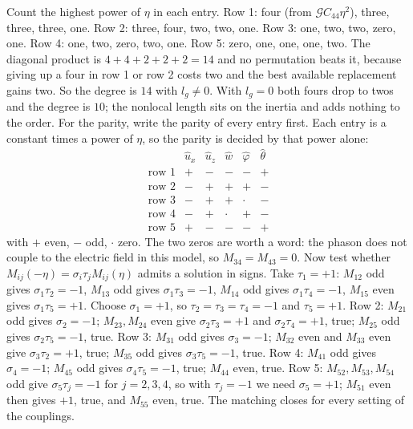 \documentclass[11pt]{article}
\makeatletter
\newif\ifshowworked
\newenvironment{worked}{%
  \ifshowworked\par\smallskip\noindent\textit{Working.}\par\smallskip\else
  \setbox\z@\vbox\bgroup\fi}{\ifshowworked\par\smallskip\else\egroup\fi}
\newcommand{\Gcal}{\mathcal{G}}
\makeatother
\begin{document}
\begin{worked}
Count the highest power of $\eta$ in each entry. Row 1: four (from $\Gcal C_{44}\eta^2$), three, three,
three, one. Row 2: three, four, two, two, one. Row 3: one, two, two, zero, one. Row 4: one, two, zero,
two, one. Row 5: zero, one, one, one, two.
The diagonal product is $4+4+2+2+2=14$ and no permutation beats it, because giving up a four in row 1 or
row 2 costs two and the best available replacement gains two. So the degree is $14$ with $l_g\ne0$. With
$l_g=0$ both fours drop to twos and the degree is $10$; the nonlocal length sits on the inertia and adds
nothing to the order.
For the parity, write the parity of every entry first. Each entry is a constant times a power of $\eta$, so
the parity is decided by that power alone:
\begin{equation}
\begin{array}{c|ccccc}
 & \hat u_x & \hat u_z & \hat w & \hat\varphi & \hat\theta\\\hline
\text{row 1} & + & - & - & - & +\\
\text{row 2} & - & + & + & + & -\\
\text{row 3} & - & + & + & \cdot & -\\
\text{row 4} & - & + & \cdot & + & -\\
\text{row 5} & + & - & - & - & +
\end{array}
\end{equation}
with $+$ even, $-$ odd, $\cdot$ zero. The two zeros are worth a word: the phason does not couple to the
electric field in this model, so $M_{34}=M_{43}=0$. Now test whether
$M_{ij}(-\eta)=\sigma_i\tau_jM_{ij}(\eta)$ admits a solution in signs.
Take $\tau_1=+1$: $M_{12}$ odd gives $\sigma_1\tau_2=-1$, $M_{13}$ odd gives $\sigma_1\tau_3=-1$,
$M_{14}$ odd gives $\sigma_1\tau_4=-1$, $M_{15}$ even gives $\sigma_1\tau_5=+1$. Choose $\sigma_1=+1$,
so $\tau_2=\tau_3=\tau_4=-1$ and $\tau_5=+1$.
Row 2: $M_{21}$ odd gives $\sigma_2=-1$; $M_{23},M_{24}$ even give $\sigma_2\tau_3=+1$ and
$\sigma_2\tau_4=+1$, true; $M_{25}$ odd gives $\sigma_2\tau_5=-1$, true.
Row 3: $M_{31}$ odd gives $\sigma_3=-1$; $M_{32}$ even and $M_{33}$ even give $\sigma_3\tau_2=+1$,
true; $M_{35}$ odd gives $\sigma_3\tau_5=-1$, true.
Row 4: $M_{41}$ odd gives $\sigma_4=-1$; $M_{45}$ odd gives $\sigma_4\tau_5=-1$, true; $M_{44}$ even,
true.
Row 5: $M_{52},M_{53},M_{54}$ odd give $\sigma_5\tau_j=-1$ for $j=2,3,4$, so with
$\tau_j=-1$ we need $\sigma_5=+1$; $M_{51}$ even then gives $+1$, true, and $M_{55}$ even, true.
The matching closes for every setting of the couplings.
\end{worked}
\end{document}

